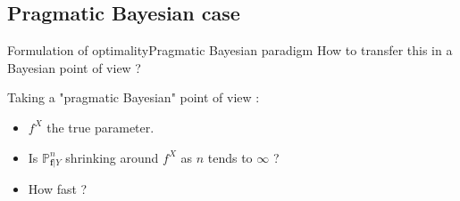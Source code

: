 \documentclass[10pt]{beamer}
\begin{document}
\subsection{Pragmatic Bayesian case}
\begin{frame}{Formulation of optimality}{Pragmatic Bayesian paradigm}
How to transfer this in a Bayesian point of view ?

\bigskip

Taking a "pragmatic Bayesian" point of view :

\bigskip

\begin{itemize}
\setlength\itemsep{3em}
\item $f^{X}$ the \textcolor{red!90!black}{true parameter}.
\item Is $\mathbb{P}_{\boldsymbol{f}\vert Y}^{n}$ \textcolor{red!90!black}{shrinking} around $f^{X}$ as $n$ tends to $\infty$ ?
\item How fast ?

\end{itemize}

\end{frame}
\end{document}
